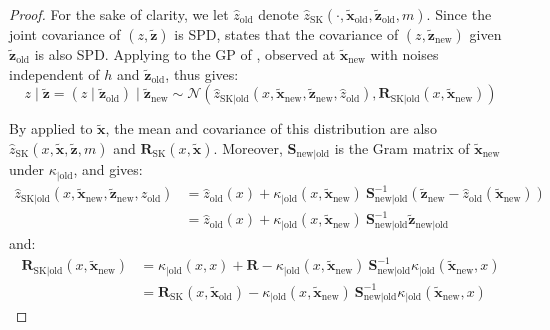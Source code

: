 \begin{proof}
	For the sake of clarity, we let $\hat{z}_{\mathrm{old}}$ denote $\hat{z}_{\mathrm{SK}}(\cdot,\tilde{\mathbf{x}}_{\mathrm{old}},\tilde{\mathbf{z}}_{\mathrm{old}},m)$. Since the joint covariance of $(z,\tilde{\mathbf{z}})$ is SPD,  states that the covariance of $(z,\tilde{\mathbf{z}}_{\mathrm{new}})$ given $\tilde{\mathbf{z}}_{\mathrm{old}}$ is also SPD. Applying  to the GP of , observed at $\tilde{\mathbf{x}}_{\mathrm{new}}$ with noises independent of $h$ and $\tilde{\mathbf{z}}_{\mathrm{old}}$, thus gives:
	\begin{equation}
		z\mid\tilde{\mathbf{z}}=(z\mid\tilde{\mathbf{z}}_{\mathrm{old}})\mid\tilde{\mathbf{z}}_{\mathrm{new}}\sim\mathcal{N}\left(\hat{z}_{\mathrm{SK}|\mathrm{old}}(x,\tilde{\mathbf{x}}_{\mathrm{new}},\tilde{\mathbf{z}}_{\mathrm{new}},\hat{z}_{\mathrm{old}}),\mathbf{R}_{\mathrm{SK}|\mathrm{old}}(x,\tilde{\mathbf{x}}_{\mathrm{new}})\right)
	\end{equation}

	By  applied to $\tilde{\mathbf{x}}$, the mean and covariance of this distribution are also $\hat{z}_{\mathrm{SK}}(x,\tilde{\mathbf{x}},\tilde{\mathbf{z}},m)$ and $\mathbf{R}_{\mathrm{SK}}(x,\tilde{\mathbf{x}})$. Moreover, $\mathbf{S}_{\mathrm{new}|\mathrm{old}}$ is the Gram matrix of $\tilde{\mathbf{x}}_{\mathrm{new}}$ under $\kappa_{|\mathrm{old}}$, and  gives:
	\begin{equation}
		\begin{aligned}
		\hat{z}_{\mathrm{SK}|\mathrm{old}}(x,\tilde{\mathbf{x}}_{\mathrm{new}},\tilde{\mathbf{z}}_{\mathrm{new}},\hat{z}_{\mathrm{old}})&=\hat{z}_{\mathrm{old}}(x)+\kappa_{|\mathrm{old}}(x,\tilde{\mathbf{x}}_{\mathrm{new}})\:\mathbf{S}_{\mathrm{new}|\mathrm{old}}^{-1}\left(\tilde{\mathbf{z}}_{\mathrm{new}}-\hat{z}_{\mathrm{old}}(\tilde{\mathbf{x}}_{\mathrm{new}})\right)\\
		&=\hat{z}_{\mathrm{old}}(x)+\kappa_{|\mathrm{old}}(x,\tilde{\mathbf{x}}_{\mathrm{new}})\:\mathbf{S}_{\mathrm{new}|\mathrm{old}}^{-1}\tilde{\mathbf{z}}_{\mathrm{new}|\mathrm{old}}
		\end{aligned}
	\end{equation}
	and:
	\begin{equation}
		\begin{aligned}
		\mathbf{R}_{\mathrm{SK}|\mathrm{old}}(x,\tilde{\mathbf{x}}_{\mathrm{new}})&=\kappa_{|\mathrm{old}}(x,x)+\mathbf{R}-\kappa_{|\mathrm{old}}(x,\tilde{\mathbf{x}}_{\mathrm{new}})\:\mathbf{S}_{\mathrm{new}|\mathrm{old}}^{-1}\kappa_{|\mathrm{old}}(\tilde{\mathbf{x}}_{\mathrm{new}},x)\\
		&=\mathbf{R}_{\mathrm{SK}}(x,\tilde{\mathbf{x}}_{\mathrm{old}})-\kappa_{|\mathrm{old}}(x,\tilde{\mathbf{x}}_{\mathrm{new}})\:\mathbf{S}_{\mathrm{new}|\mathrm{old}}^{-1}\kappa_{|\mathrm{old}}(\tilde{\mathbf{x}}_{\mathrm{new}},x)
		\end{aligned}
	\end{equation}
\end{proof}

